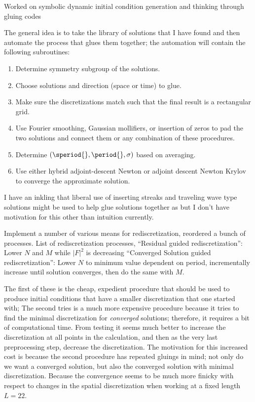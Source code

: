 \begin{itemize}
Worked on symbolic dynamic initial condition
generation and thinking through gluing codes

The general idea is to take the library of solutions that I have found
and then automate the process that glues them together; \ie
the automation will contain the following subroutines:
\begin{enumerate}
\item Determine symmetry subgroup of the solutions.
\item Choose solutions and direction (space or time) to glue.
\item Make sure the discretizations match such that the final result
is a rectangular grid.
\item Use Fourier smoothing, Gaussian mollifiers, or insertion of
zeros to pad the two solutions and connect them or any combination
of these procedures.
\item Determine $(\speriod{},\period{},\sigma)$ based on averaging.
\item Use either hybrid adjoint-descent Newton or adjoint descent
Newton Krylov to converge the approximate solution.
\end{enumerate}

I have an inkling that liberal use of inserting streaks and traveling
wave type solutions might be used to help glue solutions together as
but I don't have motivation for this other than intuition currently.

Implement a number of various means for rediscretization,
reordered a bunch of processes.
List of rediscretization processes, ``Residual guided rediscretization'':
 Lower $N$ and $M$ while $|F|^2$ is decreasing
``Converged Solution guided rediscretization'': Lower $N$ to minimum
value dependent on period, incrementally increase until solution converges,
then do
the same with $M$.

The first of these is the cheap, expedient procedure that should
 be used to produce initial conditions that
have a smaller discretization that one started with; The second
tries is a much more expensive procedure
because it tries to find the minimal discretization for \emph{converged}
solutions; therefore, it requires
a bit of computational time. From testing it seems much better to
 increase the discretization at all points
in the calculation, and then as the very last preprocessing step,
 decrease the discretization.
The motivation for this increased cost is because the second
 procedure has repeated gluings in mind; not only
do we want a converged solution, but also the converged solution
with minimal discretization. Because the convergence
seems to be much more finicky with respect to changes in the
spatial discretization when working at a fixed
length $L=22$.


\end{itemize}
